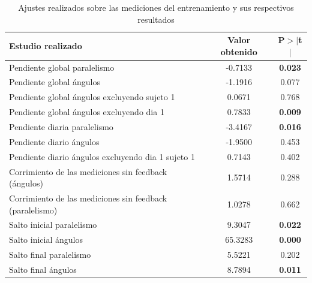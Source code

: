 \documentclass{article}
\numberwithin{figure}{section}
\begin{document}
    


    
    \begin{table}

    \begin{center}
    
    \caption{Ajustes realizados sobre las mediciones del entrenamiento y sus respectivos resultados}
    \label{tabla:betas}
    \vspace{0.3in}
    
    \begin{tabular}{lcc}
                Estudio realizado & Valor obtenido & P$>|$t$|$ \\
    \midrule
    \midrule
    
    Pendiente global paralelismo  &  -0.7133  &  \textbf{0.023} \\
    Pendiente global ángulos      &  -1.1916  &  0.077 \\
    Pendiente global ángulos excluyendo sujeto 1 &  0.0671  & 0.768 \\
    Pendiente global ángulos excluyendo dia 1    &  0.7833  & \textbf{0.009} \\
    Pendiente diaria paralelismo  &  -3.4167  &  \textbf{0.016} \\
    Pendiente diario ángulos      &  -1.9500  &  0.453 \\
    Pendiente diario ángulos excluyendo dia 1 sujeto 1 &  0.7143   &  0.402 \\
    Corrimiento de las mediciones sin feedback (ángulos)  &  1.5714  &  0.288 \\
    Corrimiento de las mediciones sin feedback (paralelismo)  &  1.0278  &  0.662 \\
    Salto inicial paralelismo     &  9.3047  &  \textbf{0.022} \\
    Salto inicial ángulos          &  65.3283  &  \textbf{0.000} \\
    Salto final paralelismo       &  5.5221  &  0.202 \\
    Salto final ángulos          &  8.7894  &  \textbf{0.011} \\
    
    \bottomrule
    \end{tabular}
    
    \end{center}
    
    \end{table}
\end{document}
